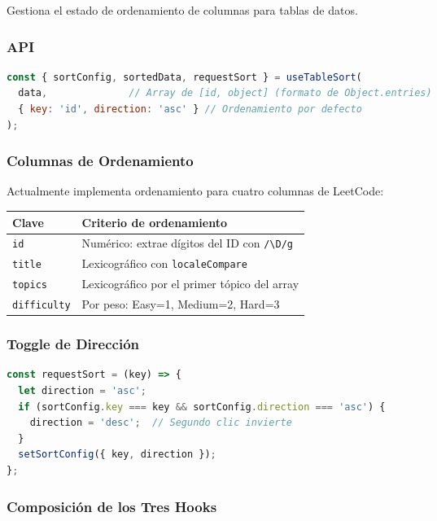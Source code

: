\documentclass[12pt,a4paper]{article}
\begin{document}
Gestiona el estado de ordenamiento de columnas para tablas de datos.

\subsubsection{API}

\begin{lstlisting}[language=JavaScript]
const { sortConfig, sortedData, requestSort } = useTableSort(
  data,              // Array de [id, object] (formato de Object.entries)
  { key: 'id', direction: 'asc' } // Ordenamiento por defecto
);
\end{lstlisting}

\subsubsection{Columnas de Ordenamiento}

Actualmente implementa ordenamiento para cuatro columnas de LeetCode:

\begin{table}[h]
\centering
\begin{tabular}{ll}
\toprule
\textbf{Clave} & \textbf{Criterio de ordenamiento} \\
\midrule
\texttt{id} & Numérico: extrae dígitos del ID con \texttt{/\textbackslash D/g} \\
\texttt{title} & Lexicográfico con \texttt{localeCompare} \\
\texttt{topics} & Lexicográfico por el primer tópico del array \\
\texttt{difficulty} & Por peso: Easy=1, Medium=2, Hard=3 \\
\bottomrule
\end{tabular}
\end{table}

\subsubsection{Toggle de Dirección}

\begin{lstlisting}[language=JavaScript]
const requestSort = (key) => {
  let direction = 'asc';
  if (sortConfig.key === key && sortConfig.direction === 'asc') {
    direction = 'desc';  // Segundo clic invierte
  }
  setSortConfig({ key, direction });
};
\end{lstlisting}

\subsubsection{Composición de los Tres Hooks}
\end{document}
